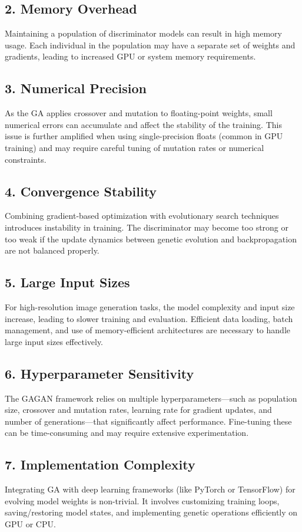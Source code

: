\documentclass[a4paper,12pt]{article}
\begin{document}
\subsection*{2. Memory Overhead}
Maintaining a population of discriminator models can result in high memory usage. Each individual in the population may have a separate set of weights and gradients, leading to increased GPU or system memory requirements.

\subsection*{3. Numerical Precision}
As the GA applies crossover and mutation to floating-point weights, small numerical errors can accumulate and affect the stability of the training. This issue is further amplified when using single-precision floats (common in GPU training) and may require careful tuning of mutation rates or numerical constraints.

\subsection*{4. Convergence Stability}
Combining gradient-based optimization with evolutionary search techniques introduces instability in training. The discriminator may become too strong or too weak if the update dynamics between genetic evolution and backpropagation are not balanced properly.

\subsection*{5. Large Input Sizes}
For high-resolution image generation tasks, the model complexity and input size increase, leading to slower training and evaluation. Efficient data loading, batch management, and use of memory-efficient architectures are necessary to handle large input sizes effectively.

\subsection*{6. Hyperparameter Sensitivity}
The GAGAN framework relies on multiple hyperparameters—such as population size, crossover and mutation rates, learning rate for gradient updates, and number of generations—that significantly affect performance. Fine-tuning these can be time-consuming and may require extensive experimentation.

\subsection*{7. Implementation Complexity}
Integrating GA with deep learning frameworks (like PyTorch or TensorFlow) for evolving model weights is non-trivial. It involves customizing training loops, saving/restoring model states, and implementing genetic operations efficiently on GPU or CPU.
\end{document}
